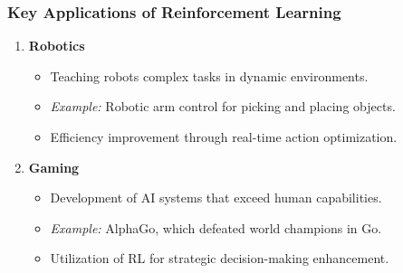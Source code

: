 \documentclass[aspectratio=169]{beamer}
\begin{document}
\begin{frame}[fragile]
    \frametitle{Key Applications of Reinforcement Learning}
    \begin{enumerate}
        \item \textbf{Robotics}
            \begin{itemize}
                \item Teaching robots complex tasks in dynamic environments.
                \item \textit{Example:} Robotic arm control for picking and placing objects.
                \item Efficiency improvement through real-time action optimization.
            \end{itemize}

        \item \textbf{Gaming}
            \begin{itemize}
                \item Development of AI systems that exceed human capabilities.
                \item \textit{Example:} AlphaGo, which defeated world champions in Go.
                \item Utilization of RL for strategic decision-making enhancement.
            \end{itemize}
    \end{enumerate}
\end{frame}
\end{document}
